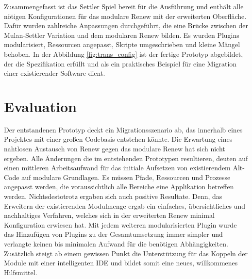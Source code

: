 	Zusammengefasst ist das Settler Spiel bereit für die Ausführung und enthält alle nötigen Konfigurationen für das modulare Renew mit der erweiterten Oberfläche. Dafür wurden zahlreiche Anpassungen durchgeführt, die eine Brücke zwischen der Mulan-Settler Variation und dem modularen Renew bilden. Es wurden Plugins modularisiert, Ressourcen angepasst, Skripte umgeschrieben und kleine Mängel behoben. \newline
	In der Abbildung \ref{fig:trans_config} ist der fertige Prototyp abgebildet, der die Spezifikation erfüllt und als ein praktisches Beispiel für eine Migration einer existierender Software dient. 

\section{Evaluation}
	Der entstandenen Prototyp deckt ein Migrationsszenario ab, das innerhalb eines Projektes mit einer großen Codebasis entstehen könnte. Die Erwartung eines nahtlosen Austausch von Renew gegen das modulare Renew hat sich nicht ergeben. Alle Änderungen die im entstehenden Prototypen resultieren, deuten auf einen mittleren Arbeitsaufwand für das initiale Aufsetzen von existierendem Alt-Code auf modulare Grundlagen. Es müssen Pfade, Ressourcen und Prozesse angepasst werden, die voraussichtlich alle Bereiche eine Applikation betreffen werden.\newline
	Nichtsdestotrotz ergaben sich auch positive Resultate. Denn, das Erweitern der existierenden Modulmenge ergab ein einfaches, übersichtliches und nachhaltiges Verfahren, welches sich in der erweiterten Renew minimal Konfiguration erwiesen hat. Mit jedem weiteren modularisierten Plugin wurde das Hinzufügen von Plugins zu der Gesamtumsetzung immer simpler und verlangte keinen bis minimalen Aufwand für die benötigen Abhängigkeiten. Zusätzlich steigt ab einem gewissen Punkt die Unterstützung für das Koppeln der Module mit einer intelligenten IDE und bildet somit eine neues, willkommenes Hilfsmittel.
